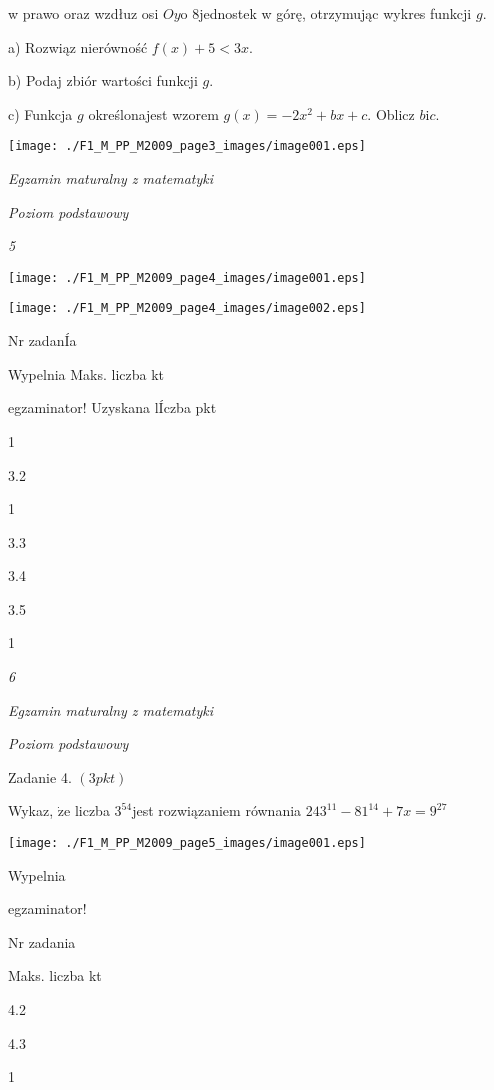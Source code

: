 \documentclass[a4paper,12pt]{article}
\begin{document}
w prawo oraz wzdłuz osi $Oy\mathrm{o}$ 8jednostek w górę, otrzymując wykres funkcji $g.$

a) Rozwiąz nierówność $f(x)+5<3x.$

b) Podaj zbiór wartości funkcji $g.$

c) Funkcja $g$ określonajest wzorem $g(x)=-2x^{2}+bx+c$. Oblicz $b\mathrm{i}c.$
\begin{center}
\texttt{[image: ./F1\_M\_PP\_M2009\_page3\_images/image001.eps]}
\end{center}




{\it Egzamin maturalny z matematyki}

{\it Poziom podstawowy}

{\it 5}
\begin{center}
\texttt{[image: ./F1\_M\_PP\_M2009\_page4\_images/image001.eps]}

\texttt{[image: ./F1\_M\_PP\_M2009\_page4\_images/image002.eps]}
\end{center}
Nr zadanÍa

Wypelnia Maks. liczba kt

egzaminator! Uzyskana lÍczba pkt

1

3.2

1

3.3

3.4

3.5

1





{\it 6}

{\it Egzamin maturalny z matematyki}

{\it Poziom podstawowy}

Zadanie 4. $(3pkt)$

Wykaz, $\dot{\mathrm{z}}\mathrm{e}$ liczba $3^{54}$jest rozwiązaniem równania $243^{11}-81^{14}+7x=9^{27}$
\begin{center}
\texttt{[image: ./F1\_M\_PP\_M2009\_page5\_images/image001.eps]}
\end{center}
Wypelnia

egzaminator!

Nr zadania

Maks. liczba kt

4.2

4.3

1
\end{document}

